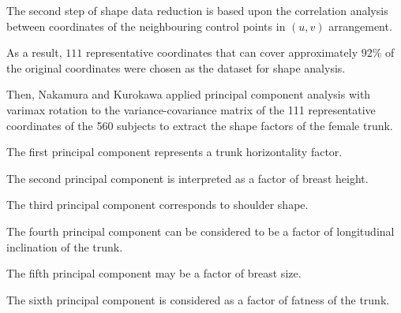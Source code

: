 \documentclass[12pt,a4paper,openany,UKenglish]{scrreprt}
\begin{document}
The second step of shape data reduction is based upon the correlation analysis between coordinates of the neighbouring control points in $(u, v)$ arrangement.
\begin{center}
	\noindent{}\end{center}

As a result, $111$ representative coordinates that can cover approximately $92\%$ of the original coordinates were chosen as the dataset for shape analysis.

Then, Nakamura and Kurokawa applied principal component analysis with varimax rotation to the variance-covariance matrix of the 111 representative coordinates of the 560 subjects to extract the shape factors of the female trunk.

The first principal component represents a trunk horizontality factor.

The second principal component is interpreted as a factor of breast height.

The third principal component corresponds to shoulder shape.

The fourth principal component can be considered to be a factor of longitudinal inclination of the trunk.

The fifth principal component may be a factor of breast size.

The sixth principal component is considered as a factor of fatness of the trunk.
\end{document}
